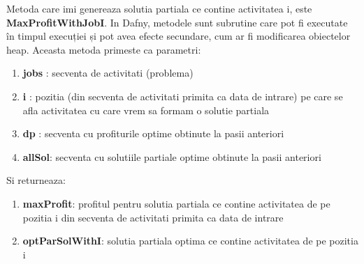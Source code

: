 Metoda care imi genereaza solutia partiala ce contine activitatea i, este \textbf{MaxProfitWithJobI}. In Dafny, metodele sunt subrutine care pot fi executate în timpul execuției și pot avea efecte secundare, cum ar fi modificarea obiectelor heap.\cite{DBLP:journals/jlap/BlazquezMS23}
Aceasta metoda primeste ca parametri: 
\begin{enumerate}
    \item \textbf{jobs} : secventa de activitati (problema)
    \item \textbf{i} : pozitia (din secventa de activitati primita ca data de intrare) pe care se afla activitatea cu care vrem sa formam o solutie partiala 
    \item \textbf{dp} : secventa cu profiturile optime obtinute la pasii anteriori
    \item \textbf{allSol}: secventa cu solutiile partiale optime obtinute la pasii anteriori
\end{enumerate}
Si returneaza:
\begin{enumerate}
    \item \textbf{maxProfit}: profitul pentru solutia partiala ce contine activitatea de pe pozitia i din secventa de activitati primita ca data de intrare
    \item \textbf{optParSolWithI}: solutia partiala optima ce contine activitatea de pe pozitia i
\end{enumerate}
